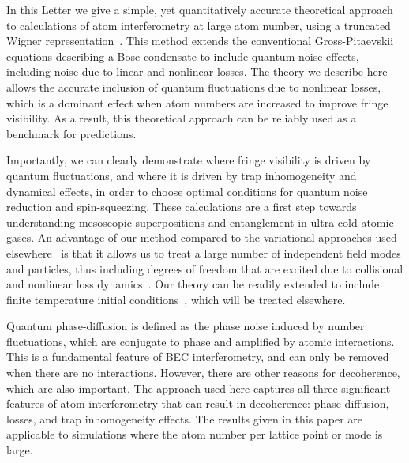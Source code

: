 \documentclass[aps,prl,twocolumn,showpacs,amsmath,amssymb,superscriptaddress,flushbottom,noraggedfooter]{revtex4-1}
\begin{document}
In this Letter we give a simple, yet quantitatively accurate theoretical approach
to calculations of atom interferometry at large atom number,
using a truncated Wigner representation~\cite{Drummond1993,Steel1998,Sinatra2002}.
This method extends the conventional Gross-Pitaevskii equations
describing a Bose condensate to include quantum noise effects,
including noise due to linear and nonlinear losses.
The theory we describe here allows the accurate inclusion of quantum fluctuations due to nonlinear losses,
which is a dominant effect when atom numbers are increased to improve fringe visibility.
As a result, this theoretical approach can be reliably used as a benchmark for predictions.

Importantly, we can clearly demonstrate where fringe visibility is driven by quantum fluctuations,
and where it is driven by trap inhomogeneity and dynamical effects,
in order to choose optimal conditions for quantum noise reduction and spin-squeezing.
These calculations are a first step towards understanding mesoscopic superpositions and entanglement in ultra-cold atomic gases.
An advantage of our method compared to the variational approaches used elsewhere~\cite{Li2009,Sakmann2009}
is that it allows us to treat a large number of independent field modes and particles,
thus including degrees of freedom that are excited due to
collisional and nonlinear loss dynamics~\cite{Norrie2005,Deuar2007}.
Our theory can be readily extended to include finite temperature initial conditions~\cite{Steel1998,Isella2006},
which will be treated elsewhere.

Quantum phase-diffusion is defined as the phase noise induced by number fluctuations,
which are conjugate to phase and amplified by atomic interactions.
This is a fundamental feature of BEC interferometry, and can only be removed when there are no interactions.
However, there are other reasons for decoherence, which are also important.
The approach used here captures all three significant features of atom
interferometry that can result in decoherence: phase-diffusion, losses,
and trap inhomogeneity effects.
The results given in this paper are applicable to simulations where the
atom number per lattice point or mode is large.
\end{document}

